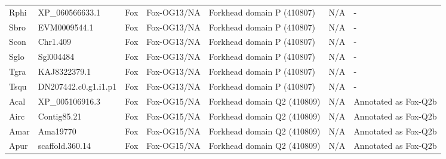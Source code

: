 \documentclass[../main.tex]{subfiles}
\begin{document}
\begin{landscape}
\begin{longtable}{lllllll}
		Rphi           & XP\_060566633.1       & Fox            & Fox-OG13/NA         & Forkhead domain P (410807)                  & N/A                                                                    & -                    \\
		Sbro           & EVM0009544.1          & Fox            & Fox-OG13/NA         & Forkhead domain P (410807)                  & N/A                                                                    & -                    \\
		Scon           & Chr1.409              & Fox            & Fox-OG13/NA         & Forkhead domain P (410807)                  & N/A                                                                    & -                    \\
		Sglo           & Sgl004484             & Fox            & Fox-OG13/NA         & Forkhead domain P (410807)                  & N/A                                                                    & -                    \\
		Tgra           & KAJ8322379.1          & Fox            & Fox-OG13/NA         & Forkhead domain P (410807)                  & N/A                                                                    & -                    \\
		Tsqu           & DN207442.c0.g1.i1.p1  & Fox            & Fox-OG13/NA         & Forkhead domain P (410807)                  & N/A                                                                    & -                    \\
		Acal           & XP\_005106916.3       & Fox            & Fox-OG15/NA         & Forkhead domain Q2 (410809)                 & N/A                                                                    & Annotated as Fox-Q2b \\
		Airc           & Contig85.21           & Fox            & Fox-OG15/NA         & Forkhead domain Q2 (410809)                 & N/A                                                                    & Annotated as Fox-Q2b \\
		Amar           & Ama19770              & Fox            & Fox-OG15/NA         & Forkhead domain Q2 (410809)                 & N/A                                                                    & Annotated as Fox-Q2b \\
		Apur           & scaffold.360.14       & Fox            & Fox-OG15/NA         & Forkhead domain Q2 (410809)                 & N/A                                                                    & Annotated as Fox-Q2b \\

\end{longtable}
\end{landscape}
\end{document}
